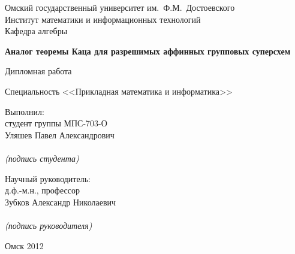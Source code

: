 \begin{titlepage}
  \begin{center}
    \begin{bf}
      Омский государственный университет им.~Ф.М.~Достоевского\\
        \vspace{2mm}
      Институт математики и информационных технологий \\
        \vspace{2mm}
      Кафедра алгебры
    \end{bf}

    \vfill\vfill

    \begin{LARGE}
      \textbf{Аналог теоремы Каца для разрешимых аффинных групповых суперсхем} \\
    \end{LARGE}

    \begin{Large}
      Дипломная работа \\
    \end{Large}
    Специальность <<Прикладная математика и информатика>>
  \end{center}

  \vfill

  \hfill \parbox{7cm}{
        Выполнил: \\
        студент группы МПС-703-О \\
        Уляшев Павел Александрович \\
        \underline{{}\hspace{5cm}{}} \\
        \vspace{-0.7mm}
        \textit{(подпись студента)}

        \vspace{8mm}

        Научный руководитель: \\
        д.ф.-м.н., профессор \\
        Зубков Александр Николаевич \\
        \underline{{}\hspace{5cm}{}} \\
        \vspace{-0.7mm}
        \textit{(подпись руководителя)}
    }

  \vfill

  \begin{center}
    \large Омск 2012
  \end{center}

\end{titlepage}
